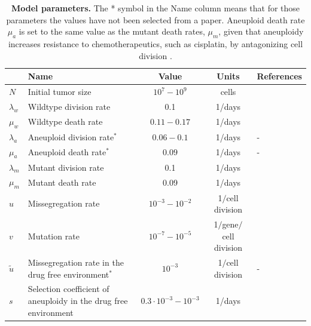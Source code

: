 \documentclass[12pt]{extarticle}
\begin{document}
\newpage
\begin{table}
\begin{center}
  \begin{tabular}{| l |p{5cm}| c | c | p{3cm} |}
    \hline
     & Name & Value & Units & References \\ \hline
    $N$ & Initial tumor size & $10^7-10^9$ & cells  & \citet{del2009does} \\ \hline
    $\lambda_w$ & Wildtype division rate& 0.1 & 1/days  & \citet{bozic2013evolutionary,rew2000cell} \\ \hline
    $\mu_w$ & Wildtype death rate& $0.11-0.17$ & 1/days  & \citet{bozic2013evolutionary} \\ \hline
    $\lambda_a$  & Aneuploid division rate$^\ast$ & $0.06-0.1$ & 1/days  & - \\ \hline
    $\mu_a$ & Aneuploid death rate$^\ast$ & $0.09$ & 1/days  & - \\ \hline
    $\lambda_m$ & Mutant division rate& 0.1 & 1/days  & \citet{bozic2013evolutionary,rew2000cell} \\ \hline
    $\mu_m$ & Mutant death rate& 0.09 & 1/days  & \citet{bozic2013evolutionary,carlson2003tumor} \\ \hline
    $u$ & Missegregation rate& $10^{-3}-10^{-2}$ & 1$\slash$cell division  & \citet{bakker2023predicting} \\ \hline
    $v$ & Mutation rate& $10^{-7}-10^{-5}$ &  1$\slash$gene$\slash$cell division  & \citet{loeb2001mutator} \\  \hline
    $\tilde{u}$ & Missegregation rate in the drug free environment$^\ast$& $10^{-3}$ & 1$\slash$cell division  & - \\ \hline
    $s$ & Selection coefficient of aneuploidy in the drug free environment& $0.3\cdot10^{-3}-10^{-3}$ &  1/days   & \citet{lukow2021chromosomal} \\  
    \hline
  \end{tabular}
\caption{\textbf{Model parameters.} %
The * symbol in the Name column means that for those parameters the values have not been selected from a paper. Aneuploid death rate $\mu_a$ is set to the same value as the mutant death rates, $\mu_m$, given that aneuploidy increases resistance to chemotherapeutics, such as cisplatin, by antagonizing cell division \citep{replogle2020aneuploidy}.
}
\end{center}
\end{table}
\end{document}
